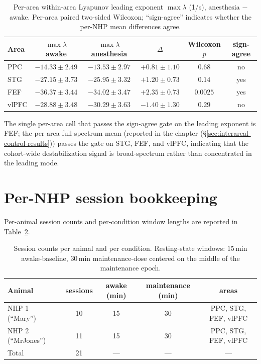 \begin{table}[h!]
\centering
\small
\caption[Per-area Lyapunov leading exponent]{Per-area within-area Lyapunov leading exponent $\max\lambda$ (1/s), anesthesia $-$ awake. Per-area paired two-sided Wilcoxon; ``sign-agree'' indicates whether the per-NHP mean differences agree.}
\label{tab:supp-interareal-control-lyap-leading}
\begin{tabular}{lccccc}
\toprule
Area  & $\max\lambda$ awake & $\max\lambda$ anesthesia & $\Delta$ & Wilcoxon $p$ & sign-agree \\
\midrule
PPC   & $-14.33\pm 2.49$ & $-13.53\pm 2.97$ & $+0.81\pm 1.10$ & $0.68$   & no  \\
STG   & $-27.15\pm 3.73$ & $-25.95\pm 3.32$ & $+1.20\pm 0.73$ & $0.14$   & yes \\
FEF   & $-36.37\pm 3.44$ & $-34.02\pm 3.47$ & $+2.35\pm 0.73$ & $0.0025$ & yes \\
vlPFC & $-28.88\pm 3.48$ & $-30.29\pm 3.63$ & $-1.40\pm 1.30$ & $0.29$   & no  \\
\bottomrule
\end{tabular}
\end{table}

\noindent The single per-area cell that passes the sign-agree gate on the leading exponent is FEF; the per-area full-spectrum mean (reported in the chapter (\S\ref{sec:interareal-control-results})) passes the gate on STG, FEF, and vlPFC, indicating that the cohort-wide destabilization signal is broad-spectrum rather than concentrated in the leading mode.

\section{Per-NHP session bookkeeping}\label{supp:interareal-control-bookkeeping}

Per-animal session counts and per-condition window lengths are reported in Table~\ref{tab:supp-interareal-control-bookkeeping}.

\begin{table}[h!]
\centering
\small
\caption[Per-animal session and window counts]{Session counts per animal and per condition. Resting-state windows: $15\,\mathrm{min}$ awake-baseline, $30\,\mathrm{min}$ maintenance-dose centered on the middle of the maintenance epoch.}
\label{tab:supp-interareal-control-bookkeeping}
\begin{tabular}{lcccc}
\toprule
Animal & sessions & awake (min) & maintenance (min) & areas \\
\midrule
NHP 1 (``Mary'')    & 10 & 15 & 30 & PPC, STG, FEF, vlPFC \\
NHP 2 (``MrJones'') & 11 & 15 & 30 & PPC, STG, FEF, vlPFC \\
Total               & 21 & --- & --- & --- \\
\bottomrule
\end{tabular}
\end{table}

